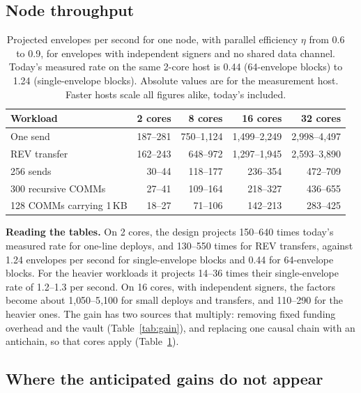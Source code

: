 \documentclass[11pt]{article}
\begin{document}
\subsection{Node throughput}

\begin{table}[h]
\centering\small
\begin{tabular}{@{}lrrrr@{}}
\toprule
\textbf{Workload} & \textbf{2 cores} & \textbf{8 cores} & \textbf{16 cores} & \textbf{32 cores} \\
\midrule
One send & 187--281 & 750--1{,}124 & 1{,}499--2{,}249 & 2{,}998--4{,}497 \\
REV transfer & 162--243 & 648--972 & 1{,}297--1{,}945 & 2{,}593--3{,}890 \\
256 sends & 30--44 & 118--177 & 236--354 & 472--709 \\
300 recursive COMMs & 27--41 & 109--164 & 218--327 & 436--655 \\
128 COMMs carrying 1\,KB & 18--27 & 71--106 & 142--213 & 283--425 \\
\bottomrule
\end{tabular}
\caption{Projected envelopes per second for one node, with parallel efficiency $\eta$ from 0.6 to 0.9, for envelopes with independent signers and no shared data channel. Today's measured rate on the same 2-core host is 0.44 (64-envelope blocks) to 1.24 (single-envelope blocks). Absolute values are for the measurement host. Faster hosts scale all figures alike, today's included.}
\label{tab:throughput}
\end{table}

\textbf{Reading the tables.} On 2 cores, the design projects 150--640 times today's measured rate for one-line deploys, and 130--550 times for REV transfers, against 1.24 envelopes per second for single-envelope blocks and 0.44 for 64-envelope blocks. For the heavier workloads it projects 14--36 times their single-envelope rate of 1.2--1.3 per second. On 16 cores, with independent signers, the factors become about 1{,}050--5{,}100 for small deploys and transfers, and 110--290 for the heavier ones. The gain has two sources that multiply: removing fixed funding overhead and the vault (Table~\ref{tab:gain}), and replacing one causal chain with an antichain, so that cores apply (Table~\ref{tab:throughput}).

\subsection{Where the anticipated gains do not appear}\label{sec:limits}
\end{document}
